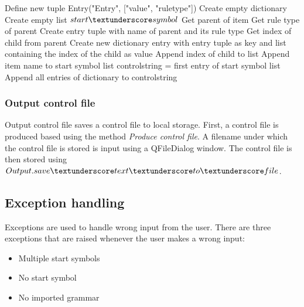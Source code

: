\begin{algorithm}[H]
\caption{GUI Algorithm: produce\textunderscore controlfile}
\label{alg:produceControlfile}
\begin{algorithmic}[1] 
\State Define new tuple Entry("Entry", ["value", "rule\textunderscore type"])
\State Create empty dictionary
\State Create empty list $start\textunderscore symbol$
	\State Get parent of item
		\State Get rule type of parent
		\State Create entry tuple with name of parent and its rule type
		\State Get index of child from parent
			\State Create new dictionary entry with entry tuple as key and list containing the index of the child as value
		\Else
			\State Append index of child to list
		\EndIf
		\State Append item name to start symbol list
	\EndIf
\EndFor
\State control\textunderscore string = first entry of start symbol list
\State Append all entries of dictionary to control\textunderscore string
\end{algorithmic}
\end{algorithm} 

\subsubsection{Output control file}\label{sec:ImplementationGUIOutput control file}

Output control file saves a control file to local storage. 
First, a control file is produced based using the method \textit{Produce control file}. A filename under which the control file is stored is input using a QFileDialog window. The control file is then stored using $Output.save\textunderscore text\textunderscore to\textunderscore file$.

\subsection{Exception handling}\label{sec:ImplementationGUIExceptionHandling}

Exceptions are used to handle wrong input from the user. There are three exceptions that are raised whenever the user makes a wrong input: 

\begin{itemize}
\item Multiple start symbols
\item No start symbol
\item No imported grammar
\end{itemize}

